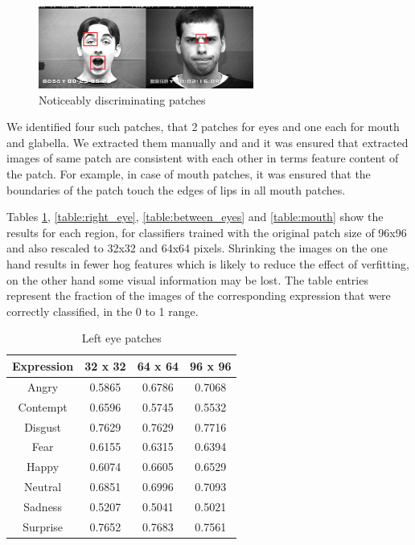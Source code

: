\begin{figure}
\centering
\includegraphics[width=200pt]{img/manual_patch.png}
  \caption{Noticeably discriminating patches}
  \label{fig:manual_patch}
\end{figure}

We identified four such patches, that 2 patches for eyes and one each for mouth and glabella. We extracted them manually and and it was ensured that extracted images of same patch are consistent with each other in terms feature content of the patch. For example, in case of mouth patches, it was ensured that the boundaries of the patch touch the edges of lips in all mouth patches.

Tables \ref{table:left_eye}, \ref{table:right_eye}, \ref{table:between_eyes} and \ref{table:mouth} show the results for each region, for classifiers trained 
with the original patch size of 96x96 and also rescaled to 32x32 and 64x64 pixels. Shrinking the images on the one hand results in fewer hog features which is likely to reduce the effect of  verfitting, on the other hand some visual information may be lost. The table entries represent the fraction of the images of the corresponding expression that were correctly classified, in the 0 to 1 range.




\begin{table}
\caption{Left eye patches}
\label{table:left_eye}

\begin{tabular}{| c | c | c | c |}
\hline
Expression & 32 x 32 &  64 x 64  & 96 x 96  \\

\hline
Angry & 0.5865 & 0.6786 & 0.7068 \\
Contempt & 0.6596 &	0.5745 & 0.5532 \\
Disgust	& 0.7629 &	0.7629 &	0.7716 \\
Fear &	0.6155 & 0.6315 & 0.6394 \\ 
Happy &	0.6074 & 0.6605 & 0.6529 \\ 
Neutral & 0.6851 &	0.6996 & 0.7093 \\
Sadness & 0.5207 & 0.5041 &	0.5021 \\
Surprise & 0.7652 &	0.7683 & 0.7561 \\

\hline
\end{tabular}
\end{table}

